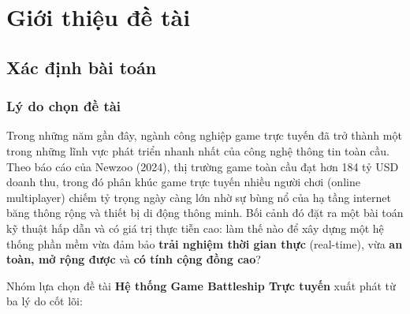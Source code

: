 \documentclass[13pt, a4paper]{extreport}
\begin{document}
\chapter{Giới thiệu đề tài}

\section{Xác định bài toán}

\subsection{Lý do chọn đề tài}

Trong những năm gần đây, ngành công nghiệp game trực tuyến đã trở thành một trong những lĩnh vực
phát triển nhanh nhất của công nghệ thông tin toàn cầu. Theo báo cáo của Newzoo (2024), thị trường
game toàn cầu đạt hơn 184 tỷ USD doanh thu, trong đó phân khúc game trực tuyến nhiều người chơi
(online multiplayer) chiếm tỷ trọng ngày càng lớn nhờ sự bùng nổ của hạ tầng internet băng thông
rộng và thiết bị di động thông minh. Bối cảnh đó đặt ra một bài toán kỹ thuật hấp dẫn và có giá
trị thực tiễn cao: làm thế nào để xây dựng một hệ thống phần mềm vừa đảm bảo \textbf{trải nghiệm
thời gian thực} (real-time), vừa \textbf{an toàn, mở rộng được} và \textbf{có tính cộng đồng cao}?

Nhóm lựa chọn đề tài \textbf{Hệ thống Game Battleship Trực tuyến} xuất phát từ ba lý do cốt lõi:
\end{document}
